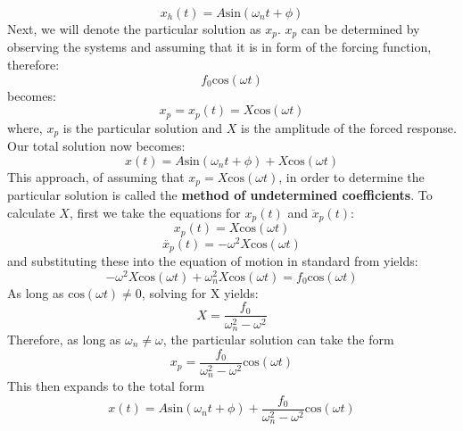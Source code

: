 \documentclass[12pt,letter]{article}
\numberwithin{ex}{section} %
\begin{document}
			\begin{equation}
				x_h(t) = A\text{sin}(\omega_n t + \phi)
			\end{equation}			
			Next, we will denote the particular solution as $x_p$. $x_p$ can be determined by observing the systems and assuming that it is in form of the forcing function, therefore:
			\begin{equation}
				f_0\text{cos}(\omega t)
			\end{equation}	
			becomes:
			\begin{equation}
				x_p = x_p(t) =X\text{cos}(\omega t)
			\end{equation}						
			where, $x_p$ is the particular solution and $X$ is the amplitude of the forced response. Our total solution now becomes:
			\begin{equation}
				x(t) = A\text{sin}(\omega_n t + \phi) + X\text{cos}(\omega t) 
			\end{equation}				
			This approach, of assuming that $x_p=X\text{cos}(\omega t)$, in order to determine the particular solution is called the \textbf{method of undetermined coefficients}. To calculate $X$, first we take the equations for $x_p(t)$ and $\ddot{x}_p(t) $:
			\begin{equation}
				x_p(t) = X\text{cos}(\omega t)
			\end{equation}	
			\begin{equation}
				\ddot{x_p}(t) = -\omega^2X\text{cos}(\omega t)
			\end{equation}				
			and substituting these into the equation of motion in standard from yields:
			\begin{equation}
				-\omega^2X\text{cos}(\omega t)+\omega_n^2X\text{cos}(\omega t) = f_0\text{cos}(\omega t)
			\end{equation}		
			As long as 	$\text{cos}(\omega t) \neq  0$, solving for X yields:
			\begin{equation}
				X = \frac{f_0}{\omega_n^2-\omega^2}
			\end{equation}		
			Therefore, as long as $\omega_n \neq \omega$, the particular solution can take the form
			\begin{equation}
				x_p = \frac{f_0}{\omega_n^2-\omega^2}\text{cos}(\omega t)
			\end{equation}						
			This then expands to the total form
			\begin{equation}
				x(t) = A\text{sin}(\omega_n t + \phi) + \frac{f_0}{\omega_n^2-\omega^2}\text{cos}(\omega t)
			\end{equation}				
\end{document}
